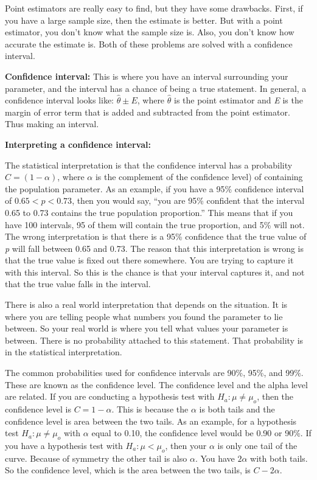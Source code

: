 \documentclass[]{book}
\begin{document}
Point estimators are really easy to find, but they have some drawbacks. First, if you have a large sample size, then the estimate is better. But with a point estimator, you don't know what the sample size is. Also, you don't know how accurate the estimate is. Both of these problems are solved with a confidence interval.

\textbf{Confidence interval:} This is where you have an interval surrounding your parameter, and the interval has a chance of being a true statement. In general, a confidence interval looks like: \(\hat{\theta}\pm E\), where \(\hat{\theta}\) is the point estimator and \emph{E} is the margin of error term that is added and subtracted from the point estimator. Thus making an interval.

\textbf{Interpreting a confidence interval: }

The statistical interpretation is that the confidence interval has a probability \(C=(1-\alpha)\), where \(\alpha\) is the complement of the confidence level) of containing the population parameter. As an example, if you have a 95\% confidence interval of \(0.65 < p < 0.73\), then you would say, ``you are 95\% confident that the interval 0.65 to 0.73 contains the true population proportion.'' This means that if you have 100 intervals, 95 of them will contain the true proportion, and 5\% will not. The wrong interpretation is that there is a 95\% confidence that the true value of \emph{p} will fall between 0.65 and 0.73. The reason that this interpretation is wrong is that the true value is fixed out there somewhere. You are trying to capture it with this interval. So this is the chance is that your interval captures it, and not that the true value falls in the interval.

There is also a real world interpretation that depends on the situation. It is where you are telling people what numbers you found the parameter to lie between. So your real world is where you tell what values your parameter is between. There is no probability attached to this statement. That probability is in the statistical interpretation.

The common probabilities used for confidence intervals are 90\%, 95\%, and 99\%. These are known as the confidence level. The confidence level and the alpha level are related. If you are conducting a hypothesis test with \(H_a:\mu\ne \mu_o\), then the confidence level is \(C=1-\alpha\). This is because the \(\alpha\) is both tails and the confidence level is area between the two tails. As an example, for a hypothesis test \(H_a:\mu\ne \mu_o\) with \(\alpha\) equal to 0.10, the confidence level would be 0.90 or 90\%. If you have a hypothesis test with \(H_a:\mu<\mu_o\), then your \(\alpha\) is only one tail of the curve. Because of symmetry the other tail is also \(\alpha\). You have \(2\alpha\) with both tails. So the confidence level, which is the area between the two tails, is \(C-2\alpha\).
\end{document}
